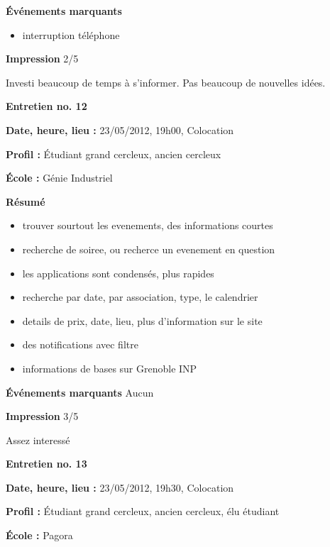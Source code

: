 \documentclass[a4paper, 11px]{article}
\begin{document}
\vspace{.25cm}
\textbf{Événements marquants}
	\begin{itemize}
		\item interruption téléphone
	\end{itemize}

\vspace{.25cm}
\textbf{Impression}
2/5

Investi beaucoup de temps à s'informer. Pas beaucoup de nouvelles idées.



\vspace{.3cm}

 \textbf {\large Entretien no. 12}

\textbf{Date, heure, lieu : }
23/05/2012, 19h00, Colocation

\textbf{Profil : }
Étudiant grand cercleux, ancien cercleux

\textbf{École : }
Génie Industriel

\textbf{Résumé}
	\begin{itemize}
		\item trouver sourtout les evenements, des informations courtes
		\item recherche de soiree, ou recherce un evenement en question
		\item les applications sont condensés, plus rapides
		\item recherche par date, par association, type, le calendrier
		\item details de prix, date, lieu, plus d'information sur le site
		\item des notifications avec filtre
		\item informations de bases sur Grenoble INP
	\end{itemize}

\textbf{Événements marquants}
Aucun

\textbf{Impression}
3/5

Assez interessé


\vspace{.3cm}

 \textbf {\large Entretien no. 13}


\textbf{Date, heure, lieu : }
23/05/2012, 19h30, Colocation

\textbf{Profil : }
Étudiant grand cercleux, ancien cercleux, élu étudiant

\textbf{École : }
Pagora
\end{document}
